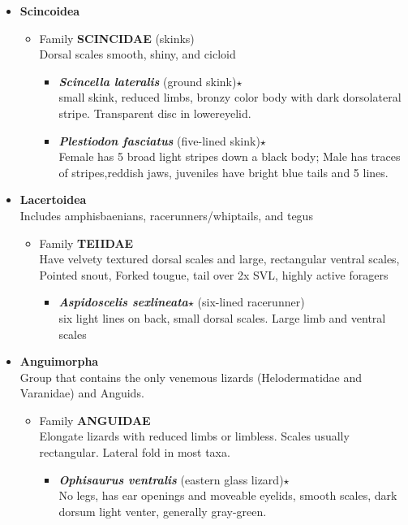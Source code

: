 \documentclass[a4paper,12pt]{article}
\begin{document}
\begin{description}
\begin{itemize}
\begin{itemize}
  \end{itemize}
  \item{\textbf{Scincoidea}}
  \begin{itemize}
    \item Family {\textbf{SCINCIDAE} (skinks)} \\ Dorsal scales smooth, shiny, and cicloid
    \begin{itemize}
      \item{\textbf{\textit{Scincella lateralis}} (ground skink)$\star$} \\ small skink, reduced limbs, bronzy color body with dark dorsolateral stripe. Transparent disc in lowereyelid.
      \item{\textbf{\textit{Plestiodon fasciatus}} (five-lined skink)$\star$} \\ Female has 5 broad light stripes down a black body; Male has traces of stripes,reddish jaws, juveniles have bright blue tails and 5 lines.
    \end{itemize}
  \end{itemize}
  \item{\textbf{Lacertoidea}} \\ Includes amphisbaenians, racerunners/whiptails, and tegus
  \begin{itemize}
    \item Family {\textbf{TEIIDAE}} \\ Have velvety textured dorsal scales and large, rectangular ventral scales, Pointed snout, Forked tougue, tail over 2x SVL, highly active foragers
    \begin{itemize}
      \item{\textbf{\textit{Aspidoscelis sexlineata$\star$}} (six-lined racerunner)} \\ six light lines on back, small dorsal scales. Large limb and ventral scales
    \end{itemize}
  \end{itemize}
    \item{\textbf{Anguimorpha}} \\ Group that contains the only venemous lizards (Helodermatidae and Varanidae) and Anguids.
  \begin{itemize}
    \item Family {\textbf{ANGUIDAE}} \\ Elongate lizards with reduced limbs or limbless. Scales usually rectangular. Lateral fold in most taxa.
    \begin{itemize}
      \item{\textbf{\textit{Ophisaurus ventralis}} (eastern glass lizard)$\star$} \\ No legs, has ear openings and moveable eyelids, smooth scales, dark dorsum light venter, generally gray-green.

\end{itemize}
\end{itemize}
\end{itemize}
\end{description}
\end{document}
